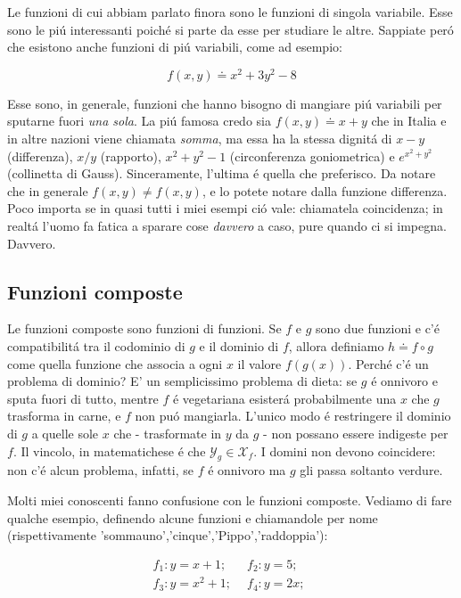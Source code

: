 Le funzioni di cui abbiam parlato finora sono le funzioni di singola variabile. Esse sono le pi\'u interessanti poich\'e si parte da esse per
studiare le altre. Sappiate per\'o che esistono anche funzioni di pi\'u variabili, come ad esempio:

\begin{equation}
 f(x,y) \doteq x^2+3y^2-8
\end{equation}

Esse sono, in generale, funzioni che hanno bisogno di mangiare pi\'u variabili per sputarne fuori {\em una sola}. La pi\'u famosa credo sia
$f(x,y) \doteq x+y$ che in Italia e in altre nazioni viene chiamata {\em somma}, ma essa ha la stessa dignit\'a di $x-y$ (differenza), $x/y$
(rapporto), $x^2+y^2-1$ (circonferenza goniometrica) e $e^{x^2+y^2}$ (collinetta di Gauss). Sinceramente, l'ultima \'e quella che preferisco.
Da notare che in generale $f(x,y) \neq f(x,y)$, e lo potete notare dalla funzione differenza. Poco importa se in quasi tutti i miei esempi ci\'o
vale: chiamatela coincidenza; in realt\'a l'uomo fa fatica a sparare cose {\em davvero} a caso, pure quando ci si impegna. Davvero. 

\subsection{Funzioni composte}

Le funzioni composte sono funzioni di funzioni. Se $f$ e $g$ sono due funzioni e c'\'e compatibilit\'a tra il codominio di $g$ e il dominio di $f$,
allora definiamo $h \doteq f \circ g$ come quella funzione che associa a ogni $x$ il valore $f(g(x))$. Perch\'e c'\'e un problema di dominio?
E' un semplicissimo problema di dieta: se $g$ \'e onnivoro e sputa fuori di tutto, mentre $f$ \'e vegetariana esister\'a probabilmente una $x$
che $g$ trasforma in carne, e $f$ non pu\'o mangiarla. L'unico modo \'e restringere il dominio di $g$ a quelle sole $x$ che - trasformate in
$y$ da $g$ - non possano essere indigeste per $f$. Il vincolo, in matematichese \'e che $\mathcal{Y}_g \in \mathcal{X}_f$. I domini non devono
coincidere: non c'\'e alcun problema, infatti, se $f$ \'e onnivoro ma $g$ gli passa soltanto verdure.

Molti miei conoscenti fanno confusione con le funzioni composte. Vediamo di fare qualche esempio, definendo alcune funzioni e chiamandole per
nome (rispettivamente 'sommauno','cinque','Pippo','raddoppia'):

\begin{equation}
 \begin{array}{lr}
f_1: y=x+1; \hspace{5pt} &	%
f_2: y=5; \hspace{5pt} \\		%
f_3: y=x^2+1; \hspace{5pt} &	%
f_4: y=2x;  \hspace{5pt} 	%
 \end{array}
\end{equation}


